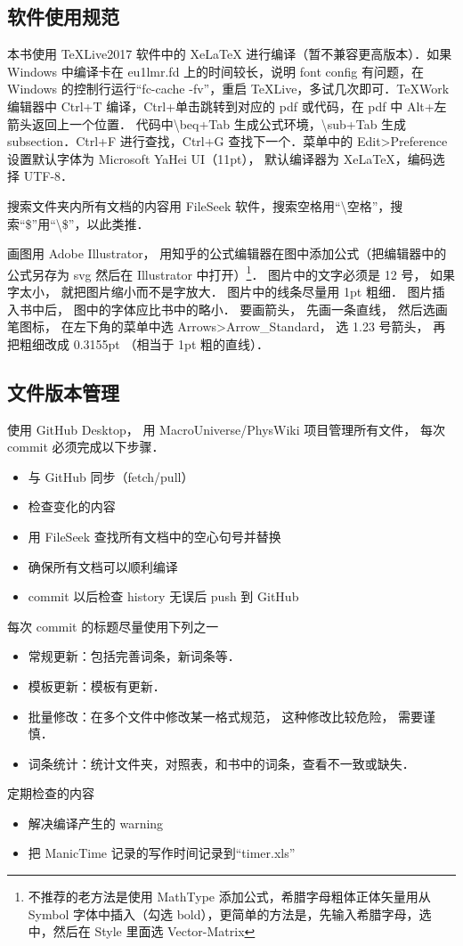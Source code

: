 
\subsection{软件使用规范}
本书使用 TeXLive2017 软件中的 XeLaTeX 进行编译（暂不兼容更高版本）．如果 Windows 中编译卡在 eu1lmr.fd 上的时间较长，说明 font config 有问题，在 Windows 的控制行运行“fc-cache -fv”，重启 TeXLive，多试几次即可．TeXWork 编辑器中 Ctrl+T 编译，Ctrl+单击跳转到对应的 pdf 或代码，在 pdf 中 Alt+左箭头返回上一个位置． 代码中\textbackslash beq+Tab 生成公式环境，\textbackslash sub+Tab 生成 subsection．Ctrl+F 进行查找，Ctrl+G 查找下一个．菜单中的 Edit>Preference 设置默认字体为 Microsoft YaHei UI（11pt）， 默认编译器为 XeLaTeX，编码选择 UTF-8．

搜索文件夹内所有文档的内容用 FileSeek 软件，搜索空格用“\textbackslash 空格”，搜索“\$”用“\textbackslash \$”，以此类推．

画图用 Adobe Illustrator， 用知乎的公式编辑器在图中添加公式（把编辑器中的公式另存为 svg 然后在 Illustrator 中打开）\footnote{不推荐的老方法是使用 MathType 添加公式，希腊字母粗体正体矢量用从 Symbol 字体中插入（勾选 bold），更简单的方法是，先输入希腊字母，选中，然后在 Style 里面选 Vector-Matrix}． 图片中的文字必须是 12 号， 如果字太小， 就把图片缩小而不是字放大． 图片中的线条尽量用 1pt 粗细． 图片插入书中后， 图中的字体应比书中的略小． 要画箭头， 先画一条直线， 然后选画笔图标， 在左下角的菜单中选 Arrows>Arrow\_Standard， 选 1.23 号箭头， 再把粗细改成 0.3155pt （相当于 1pt 粗的直线）．

\subsection{文件版本管理}
使用 GitHub Desktop， 用 MacroUniverse/PhysWiki 项目管理所有文件， 每次 commit 必须完成以下步骤．
\begin{itemize}
\item 与 GitHub 同步（fetch/pull）
\item 检查变化的内容
\item 用 FileSeek 查找所有文档中的空心句号并替换
\item 确保所有文档可以顺利编译
\item commit 以后检查 history 无误后 push 到 GitHub
\end{itemize}
每次 commit 的标题尽量使用下列之一
\begin{itemize}
\item 常规更新：包括完善词条，新词条等．
\item 模板更新：模板有更新．
\item 批量修改：在多个文件中修改某一格式规范， 这种修改比较危险， 需要谨慎．
\item 词条统计：统计文件夹，对照表，和书中的词条，查看不一致或缺失．
\end{itemize}
定期检查的内容
\begin{itemize}
\item 解决编译产生的 warning
\item 把 ManicTime 记录的写作时间记录到“timer.xls”
\end{itemize}

